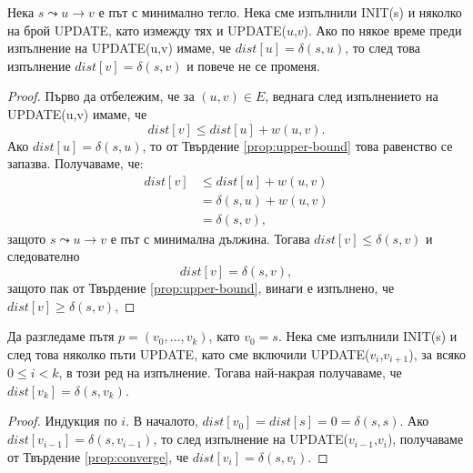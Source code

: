 \begin{prop}
  \label{prop:converge}
  Нека $s\leadsto u \to v$ е път с минимално тегло.
  Нека сме изпълнили INIT(s) и няколко на брой UPDATE, като измежду тях и UPDATE($u$,$v$).
  Ако по някое време преди изпълнение на UPDATE(u,v) 
  имаме, че $dist[u] = \delta(s,u)$, то след това изпълнение
  $dist[v] = \delta(s,v)$ и повече не се променя.
\end{prop}
\begin{proof}
  Първо да отбележим, че за $(u,v) \in E$, веднага след изпълнението на UPDATE(u,v) имаме, че
  \[dist[v] \leq dist[u] + w(u,v).\]
  Ако $dist[u] = \delta(s,u)$, то от Твърдение \ref{prop:upper-bound} това равенство се запазва.
  Получаваме, че:
  \begin{align*}
    dist[v] & \leq dist[u] + w(u,v)\\
    & = \delta(s,u) + w(u,v)\\
    & = \delta(s,v),
  \end{align*}
  защото $s\leadsto u \to v$ е път с минимална дължина.
  Тогава $dist[v] \leq \delta(s,v)$ и следователно 
  \[dist[v] = \delta(s,v),\]
  защото пак от Твърдение \ref{prop:upper-bound}, винаги е изпълнено, че $dist[v] \geq \delta(s,v)$,
\end{proof}

\begin{prop}
  \label{prop:path-update}
  Да разгледаме пътя $p = (v_0,\dots,v_k)$, като $v_0 = s$.
  Нека сме изпълнили INIT(s) и след това няколко пъти UPDATE, като сме включили 
  UPDATE($v_{i}$,$v_{i+1}$), за всяко $0\leq i < k$, в този ред на изпълнение.
  Тогава най-накрая получаваме, че $dist[v_k] = \delta(s,v_k)$.
\end{prop}
\begin{proof}
  Индукция по $i$.
  В началото, $dist[v_0] = dist[s] = 0 = \delta(s,s)$.
  Ако $dist[v_{i-1}] = \delta(s,v_{i-1})$, то след изпълнение на UPDATE($v_{i-1}$,$v_{i}$),
  получаваме от Твърдение \ref{prop:converge}, че $dist[v_i] = \delta(s,v_{i})$.
\end{proof}

